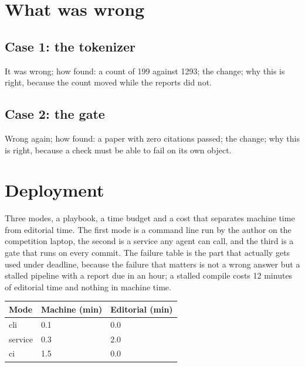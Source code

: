 \section{What was wrong}
\subsection{Case 1: the tokenizer}
It was wrong; how found: a count of 199 against 1293; the change; why this is
right, because the count moved while the reports did not.
\subsection{Case 2: the gate}
Wrong again; how found: a paper with zero citations passed; the change; why
this is right, because a check must be able to fail on its own object.

\section{Deployment}
Three modes, a playbook, a time budget and a cost that separates machine time
from editorial time. The first mode is a command line run by the author on the
competition laptop, the second is a service any agent can call, and the third is
a gate that runs on every commit. The failure table is the part that actually
gets used under deadline, because the failure that matters is not a wrong
answer but a stalled pipeline with a report due in an hour; a stalled compile
costs 12 minutes of editorial time and nothing in machine time.

\begin{table}\centering
\begin{tabular}{@{}lll@{}}
\toprule
Mode & Machine (min) & Editorial (min) \\
\midrule
cli & 0.1 & 0.0 \\
service & 0.3 & 2.0 \\
ci & 1.5 & 0.0 \\
\bottomrule
\end{tabular}
\end{table}


